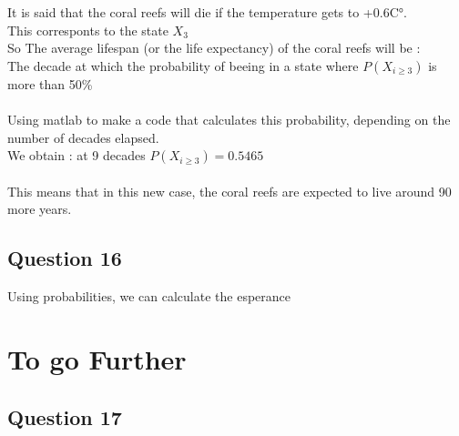 \documentclass{article}
\begin{document}
    It is said that the coral reefs will die if the temperature gets to +0.6C°.
    \\This corresponts to the state $X_3$
    \\So The average lifespan (or the life expectancy) of the coral reefs will be :\\
    The decade at which the probability of beeing in a state where $P(X_{i\geq3})$ is more than 50\%\\
    \\
    Using matlab to make a code that calculates this probability, depending on the number of decades elapsed.\\
    We obtain : at 9 decades $P(X_{i\geq3}) = 0.5465$\\
    \\
    This means that in this new case, the coral reefs are expected to live around 90 more years.

    \subsection*{Question 16}

    Using probabilities, we can calculate the esperance

    \section*{To go Further}

    \subsection*{Question 17}
    
\end{document}
